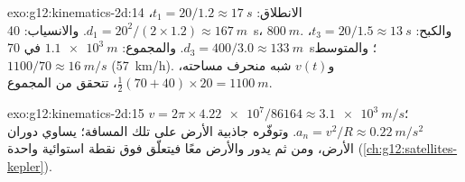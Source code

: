 \begin{solution}{exo:g12:kinematics-2d:14}
الانطلاق: $t_1 = 20/1.2 \approx \qty{17}{s}$،
$d_1 = 20^2/(2 \times 1.2) \approx \qty{167}{m}$. والانسياب:
\qty{40}{s}، $\qty{800}{m}$. والكبح: $t_3 = 20/1.5 \approx
\qty{13}{s}$، $d_3 = 400/3.0 \approx \qty{133}{m}$. والمجموع:
$\qty{1.1e3}{m}$ في \qty{70}{s}؛ والمتوسط $1100/70 \approx
\qty{16}{m/s}$ (\qty{57}{km/h}). و$v(t)$ شبه منحرف مساحته،
$\tfrac12(70 + 40) \times 20 = \qty{1100}{m}$، تتحقق من المجموع.
\end{solution}

\begin{solution}{exo:g12:kinematics-2d:15}
$v = 2\pi \times \num{4.22e7}/\num{86164} \approx \qty{3.1e3}{m/s}$؛
$a_n = v^2/R \approx \qty{0.22}{m/s^2}$. وتوفّره جاذبية الأرض على تلك
المسافة؛  يساوي  دوران الأرض، ومن ثم يدور
 والأرض معًا فيتعلّق فوق نقطة استوائية
واحدة (\cref{ch:g12:satellites-kepler}).
\end{solution}

